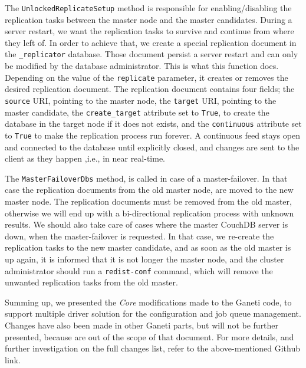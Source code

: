 \begin{description}
    The \texttt{UnlockedReplicateSetup} method is responsible for
    enabling/disabling the replication tasks between the master node and the
    master candidates. During a server restart, we want the replication tasks to
    survive and continue from where they left of. In order to achieve that, we
    create a special replication document in the \texttt{\_replicator} database.
    Those document persist a server restart and can only be modified by the
    database administrator. This is what this function does. Depending on the
    value of the \texttt{replicate} parameter, it creates or removes the desired
    replication document. The replication document contains four fields; the
    \texttt{source} URI, pointing to the master node, the \texttt{target} URI,
    pointing to the master candidate, the \texttt{create\_target} attribute set
    to \texttt{True}, to create the database in the target node if it does not
    exists, and the \texttt{continuous} attribute set to \texttt{True} to make
    the replication process run forever. A continuous feed stays open and
    connected to the database until explicitly closed, and changes are sent to
    the client as they happen ,i.e., in near real-time.

    The \texttt{MasterFailoverDbs} method, is called in case of a
    master-failover. In that case the replication documents from the old master
    node, are moved to the new master node. The replication documents must be
    removed from the old master, otherwise we will end up with a bi-directional
    replication process with unknown results. We should also take care of cases
    where the master CouchDB server is down, when the master-failover is
    requested. In that case, we re-create the replication tasks to the new
    master candidate, and as soon as the old master is up again, it is informed
    that it is not longer the master node, and the cluster administrator should
    run a \texttt{redist-conf} command, which will remove the unwanted
    replication tasks from the old master.
\end{description}

Summing up, we presented the \emph{Core} modifications made to the Ganeti code,
to support multiple driver solution for the configuration and job queue
management. Changes have also been made in other Ganeti parts, but will not be
further presented, because are out of the scope of that document. For more
details, and further investigation on the full changes list, refer to the
above-mentioned Github link.

